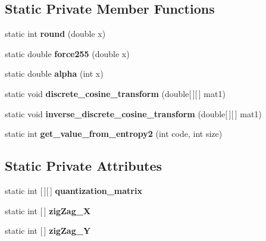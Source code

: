 \subsection*{Static Private Member Functions}
\begin{DoxyCompactItemize}
\item 
\mbox{\label{classdomini_1_1algorithm_1_1JPEG_a26704d0281063c49a1c005e0496220a7}} 
static int {\bfseries round} (double x)
\item 
\mbox{\label{classdomini_1_1algorithm_1_1JPEG_af93979340e9745708d2e2d41ded34419}} 
static double {\bfseries force255} (double x)
\item 
\mbox{\label{classdomini_1_1algorithm_1_1JPEG_a058b0ee7eb44bbaec4078b5fc32c5107}} 
static double {\bfseries alpha} (int x)
\item 
\mbox{\label{classdomini_1_1algorithm_1_1JPEG_ae089373d26fecc912f954a1d921c79d9}} 
static void {\bfseries discrete\+\_\+cosine\+\_\+transform} (double\mbox{[}$\,$\mbox{]}\mbox{[}$\,$\mbox{]} mat1)
\item 
\mbox{\label{classdomini_1_1algorithm_1_1JPEG_a7d71cc9f6447cd36189a30eafe10314e}} 
static void {\bfseries inverse\+\_\+discrete\+\_\+cosine\+\_\+transform} (double\mbox{[}$\,$\mbox{]}\mbox{[}$\,$\mbox{]} mat1)
\item 
\mbox{\label{classdomini_1_1algorithm_1_1JPEG_a6abdee6c1601b4b11b5dfa7cfe531ca0}} 
static int {\bfseries get\+\_\+value\+\_\+from\+\_\+entropy2} (int code, int size)
\end{DoxyCompactItemize}
\subsection*{Static Private Attributes}
\begin{DoxyCompactItemize}
\item 
static int \mbox{[}$\,$\mbox{]}\mbox{[}$\,$\mbox{]} {\bfseries quantization\+\_\+matrix}
\item 
static int \mbox{[}$\,$\mbox{]} {\bfseries zig\+Zag\+\_\+X}
\item 
static int \mbox{[}$\,$\mbox{]} {\bfseries zig\+Zag\+\_\+Y}
\end{DoxyCompactItemize}


